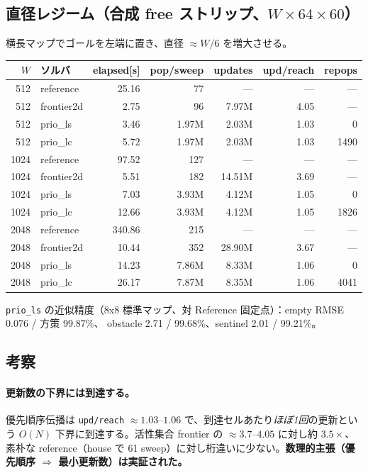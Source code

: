 \documentclass[11pt]{article}
\begin{document}
\subsection{直径レジーム（合成 free ストリップ、$W\times64\times60$）}
横長マップでゴールを左端に置き、直径 $\approx W/6$ を増大させる。
\begin{center}
\begin{tabular}{rlrrrrr}
\toprule
$W$ & ソルバ & elapsed[s] & pop/sweep & updates & upd/reach & repops \\
\midrule
512  & reference  & 25.16  & 77   & ---    & ---  & --- \\
512  & frontier2d & 2.75   & 96   & 7.97M  & 4.05 & --- \\
512  & prio\_ls   & 3.46   & 1.97M& 2.03M  & 1.03 & 0 \\
512  & prio\_lc   & 5.72   & 1.97M& 2.03M  & 1.03 & 1490 \\
\midrule
1024 & reference  & 97.52  & 127  & ---    & ---  & --- \\
1024 & frontier2d & 5.51   & 182  & 14.51M & 3.69 & --- \\
1024 & prio\_ls   & 7.03   & 3.93M& 4.12M  & 1.05 & 0 \\
1024 & prio\_lc   & 12.66  & 3.93M& 4.12M  & 1.05 & 1826 \\
\midrule
2048 & reference  & 340.86 & 215  & ---    & ---  & --- \\
2048 & frontier2d & 10.44  & 352  & 28.90M & 3.67 & --- \\
2048 & prio\_ls   & 14.23  & 7.86M& 8.33M  & 1.06 & 0 \\
2048 & prio\_lc   & 26.17  & 7.87M& 8.35M  & 1.06 & 4041 \\
\bottomrule
\end{tabular}
\end{center}
\texttt{prio\_ls} の近似精度（8x8 標準マップ、対 Reference 固定点）：empty RMSE 0.076 / 方策 99.87\%、
obstacle 2.71 / 99.68\%、sentinel 2.01 / 99.21\%。

\subsection{考察}
\paragraph{更新数の下界には到達する。}
優先順序伝播は \texttt{upd/reach} $\approx 1.03$--$1.06$ で、到達セルあたり\emph{ほぼ1回}の更新という
$O(N)$ 下界に到達する。活性集合 frontier の $\approx 3.7$--$4.05$ に対し約 $3.5\times$、素朴な
reference（house で 61 sweep）に対し桁違いに少ない。\textbf{数理的主張（優先順序 $\Rightarrow$ 最小更新数）は実証された。}
\end{document}
